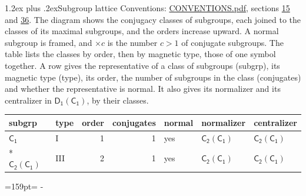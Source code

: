 \documentclass[10pt,a4paper]{article}
\makeatletter
\renewcommand\section{\@startsection{section}{1}{\z@}{-3ex plus -1ex minus -.2ex}%
  {1.2ex plus .2ex}{\normalfont\large\sffamily\bfseries\color{parttitle}}}
\newcommand{\needspace}[1]{\par\penalty-100\begingroup\dimen0=#1\relax\dimen2=\pagegoal
  \advance\dimen2-\pagetotal\ifdim\dimen0>\dimen2\relax\ifdim\dimen2>0pt\vfil\break\fi\fi
  \endgroup}
\numberwithin{equation}{section}
\newcommand{\grp}[1]{\mathsf{#1}}
\makeatother
\begin{document}
\section{Subgroup lattice}\label{s:subgroups}
Conventions: \href{../../CONVENTIONS.pdf}{CONVENTIONS.pdf}, sections \href{../../../rotation/CONVENTIONS.pdf\#conv.15}{15} and \href{../../CONVENTIONS.pdf\#conv.36}{36}.
The diagram shows the conjugacy classes of subgroups, each joined to the classes of its maximal subgroups, and the orders increase upward. \label{n:index.conjugates.c}A normal subgroup is framed, and ${\times}c$ is the number $c > 1$ of conjugate subgroups. The table lists the classes by order, then by magnetic type, those of one symbol together. \label{n:head.subgroup}\label{n:head.magnetic.type}\label{n:head.order}\label{n:head.conjugates}\label{n:head.normal}A row gives the representative of a class of subgroups (subgrp), its magnetic type (type), its order, the number of subgroups in the class (conjugates) and whether the representative is normal. \label{n:head.normalizer}\label{n:head.centralizer}It also gives its normalizer and its centralizer in $\grp{D_{1}}(\grp{C_{1}})$, by their classes. 
\begin{center}
\end{center}
{\small\begin{longtable}{@{}llrrlll@{}}\toprule
subgrp & type & order & conjugates & normal & normalizer & centralizer\\\midrule\endhead
\bottomrule\endfoot\endlastfoot
\href{../../../rotation/data/pdf/C1.pdf}{$\grp{C_{1}}$} & I & 1 & 1 & yes & \href{C2-C1.pdf}{$\grp{C_{2}}(\grp{C_{1}})$} & \href{C2-C1.pdf}{$\grp{C_{2}}(\grp{C_{1}})$}\\*
\href{C2-C1.pdf}{$\grp{C_{2}}(\grp{C_{1}})$} & III & 2 & 1 & yes & \href{C2-C1.pdf}{$\grp{C_{2}}(\grp{C_{1}})$} & \href{C2-C1.pdf}{$\grp{C_{2}}(\grp{C_{1}})$}\\
\bottomrule\end{longtable}}
\needspace{159pt}
\end{document}
